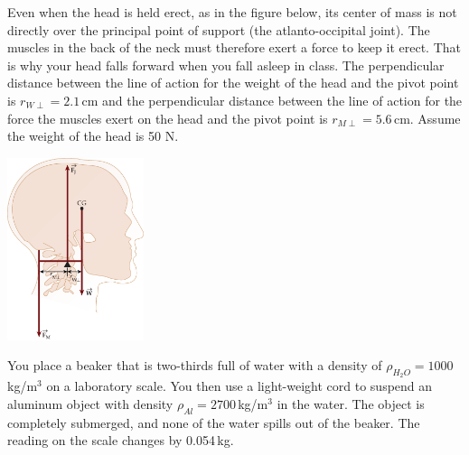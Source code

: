 \documentclass[letterpaper,addpoints,answers]{exam}
\begin{document}
\begin{questions}
\question
Even when the head is held erect, as in the figure below, its center of mass is not directly over the principal point of support (the atlanto-occipital joint). The muscles in the back of the neck must therefore exert a force to keep it erect. That is why your head falls forward when you fall asleep in class. The perpendicular distance between the line of action for the weight of the head and the pivot point is $r_{W\perp} = 2.1$\,cm and the perpendicular distance between the line of action for the force the muscles exert on the head and the pivot point is $r_{M\perp} = 5.6$\,cm. Assume the weight of the head is 50 N.
\begin{center}
 \includegraphics[width=0.3\textwidth]{head}
\end{center}


\pagebreak

\question
You place a beaker that is two-thirds full of water with a density of $\rho_{H_2O} = 1000$\,kg/m$^3$ on a laboratory scale. You then use a light-weight cord to suspend an aluminum object with density $\rho_{Al} = 2700$\,kg/m$^3$ in the water. The object is completely submerged, and none of the water spills out of the beaker. The reading on the scale changes by 0.054\,kg.
\end{questions}
\end{document}
